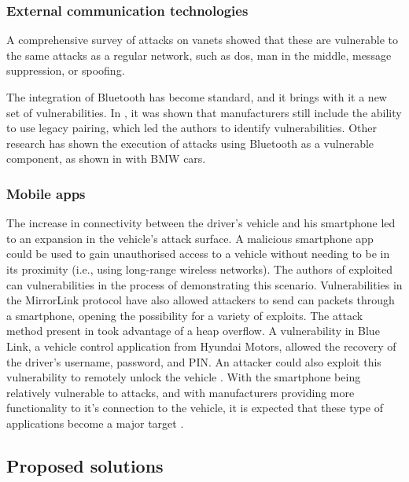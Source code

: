 \subsubsection{External communication technologies}

A comprehensive survey of attacks on \glspl{vanet} \cite{Hasrouny2017} showed that these are vulnerable to the same attacks as a regular network, such as \gls{dos}, man in the middle, message suppression, or spoofing.\par
The integration of Bluetooth has become standard, and it brings with it a new set of vulnerabilities. In \cite{Cheah2017}, it was shown that manufacturers still include the ability to use legacy pairing, which led the authors to identify vulnerabilities. Other research has shown the execution of attacks using Bluetooth as a vulnerable component, as shown in \cite{Cai2019} with BMW cars.

\subsubsection{Mobile apps}

The increase in connectivity between the driver’s vehicle and his smartphone led to an expansion in the vehicle’s attack surface. A malicious smartphone app could be used to gain unauthorised access to a vehicle without needing to be in its proximity (i.e., using long-range wireless networks). The authors of \cite{Woo2015} exploited \gls{can} vulnerabilities in the process of demonstrating this scenario. Vulnerabilities in the MirrorLink protocol have also allowed attackers to send \gls{can} packets through a smartphone, opening the possibility for a variety of exploits. The attack method present in \cite{mazloom2016security} took advantage of a heap overflow. A vulnerability in Blue Link, a vehicle control application from Hyundai Motors, allowed the recovery of the driver's username, password, and PIN. An attacker could also exploit this vulnerability to remotely unlock the vehicle \citep{toddbluelink}. With the smartphone being relatively vulnerable to attacks, and with manufacturers providing more functionality to it's connection to the vehicle, it is expected that these type of applications become a major target \citep{Kim2021}.

\subsection{Proposed solutions}

